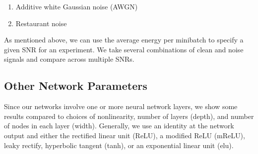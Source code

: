 \begin{enumerate}
    \item Additive white Gaussian noise (AWGN)
    \item Restaurant noise
\end{enumerate}

As mentioned above, we can use the average energy per minibatch to specify a given SNR for an experiment. We take several combinations of clean and noise signals and compare across multiple SNRs.

\subsection{Other Network Parameters}
Since our networks involve one or more neural network layers, we show some results compared to choices of nonlinearity, number of layers (depth), and number of nodes in each layer (width). Generally, we use an identity at the network output and either the rectified linear unit (ReLU), a modified ReLU (mReLU), leaky rectify, hyperbolic tangent (tanh), or an exponential linear unit (elu).
